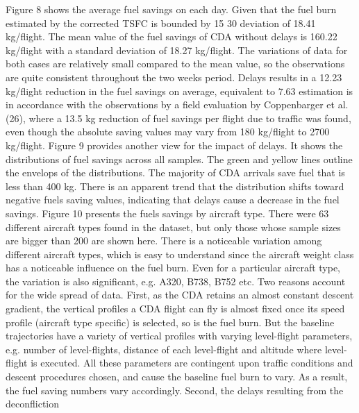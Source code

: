 \documentclass{aer1315-pretty}
\begin{document}
\begin{itemize}
Figure 8 shows the average fuel savings on each day. Given that the fuel burn estimated
by the corrected TSFC is bounded by 15%
30%
deviation of 18.41 kg/flight. The mean value of the fuel savings of CDA without delays is 160.22
kg/flight with a standard deviation of 18.27 kg/flight. The variations of data for both cases are
relatively small compared to the mean value, so the observations are quite consistent throughout
the two weeks period. Delays results in a 12.23 kg/flight reduction in the fuel savings on
average, equivalent to 7.63%
estimation is in accordance with the observations by a field evaluation by Coppenbarger et al.
(26), where a 13.5 kg reduction of fuel savings per flight due to traffic was found, even though
the absolute saving values may vary from 180 kg/flight to 2700 kg/flight.
Figure 9 provides another view for the impact of delays. It shows the distributions of fuel
savings across all samples. The green and yellow lines outline the envelops of the distributions.
The majority of CDA arrivals save fuel that is less than 400 kg. There is an apparent trend that
the distribution shifts toward negative fuels saving values, indicating that delays cause a decrease
in the fuel savings.
Figure 10 presents the fuels savings by aircraft type. There were 63 different aircraft
types found in the dataset, but only those whose sample sizes are bigger than 200 are shown
here. There is a noticeable variation among different aircraft types, which is easy to understand
since the aircraft weight class has a noticeable influence on the fuel burn. Even for a particular
aircraft type, the variation is also significant, e.g. A320, B738, B752 etc. Two reasons account
for the wide spread of data. First, as the CDA retains an almost constant descent gradient, the
vertical profiles a CDA flight can fly is almost fixed once its speed profile (aircraft type specific)
is selected, so is the fuel burn. But the baseline trajectories have a variety of vertical profiles with
varying level-flight parameters, e.g. number of level-flights, distance of each level-flight and
altitude where level-flight is executed. All these parameters are contingent upon traffic
conditions and descent procedures chosen, and cause the baseline fuel burn to vary. As a result,
the fuel saving numbers vary accordingly. Second, the delays resulting from the deconfliction




\end{itemize}
\end{document}
